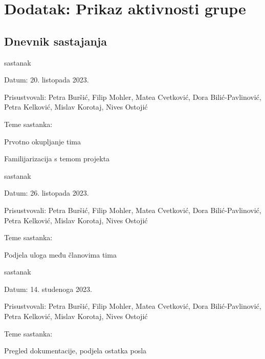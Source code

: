 \chapter*{Dodatak: Prikaz aktivnosti grupe}
		
		\section*{Dnevnik sastajanja}
		
		
		
		\begin{packed_enum}
			\item  sastanak
			
			\item[] \begin{packed_item}
				\item Datum: 20. listopada 2023.
				\item Prisustvovali: Petra Buršić, Filip Mohler, Matea Cvetković, Dora Bilić-Pavlinović, Petra Kelković, Mislav Korotaj, Nives Ostojić
				\item Teme sastanka:
				\begin{packed_item}
					\item  Prvotno okupljanje tima
					\item  Familijarizacija s temom projekta
				\end{packed_item}
			\end{packed_item}
			
			\item  sastanak
			\item[] \begin{packed_item}
				\item Datum: 26. listopada 2023.
				\item Prisustvovali: Petra Buršić, Filip Mohler, Matea Cvetković, Dora Bilić-Pavlinović, Petra Kelković, Mislav Korotaj, Nives Ostojić
				\item Teme sastanka:
				\begin{packed_item}
					\item  Podjela uloga među članovima tima
				\end{packed_item}
			\end{packed_item}
			
			\item  sastanak
			\item[] \begin{packed_item}
				\item Datum: 14. studenoga 2023.
				\item Prisustvovali: Petra Buršić, Filip Mohler, Matea Cvetković, Dora Bilić-Pavlinović, Petra Kelković, Mislav Korotaj, Nives Ostojić
				\item Teme sastanka:
				\begin{packed_item}
					\item  Pregled dokumentacije, podjela ostatka posla
				\end{packed_item}
			\end{packed_item}
			

\end{packed_enum}
